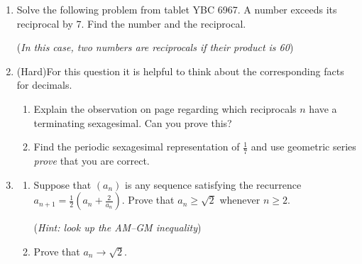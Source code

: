 \begin{exercises*}{}{}
\begin{enumerate}
  \item%
  Solve the following problem from tablet YBC 6967. A number exceeds its reciprocal by 7. Find the number and the reciprocal.\par
  (\emph{In this case, two numbers are reciprocals if their product is 60})

  \item (Hard)\lstsp For this question it is helpful to think about the corresponding facts for decimals.
  \begin{enumerate}
    \item Explain the observation on page \pageref{babfraction} regarding which reciprocals $n$ have a terminating sexagesimal. Can you prove this?
  	\item Find the periodic sexagesimal representation of $\frac 17$ and use geometric series \emph{prove} that you are correct.
  \end{enumerate}  
  
  \item\label{exs:methodmean}\begin{enumerate}
		\item Suppose that $(a_n)$ is any sequence satisfying the recurrence $a_{n+1}=\frac 12(a_n+\frac 2{a_n})$. Prove that $a_n\ge \sqrt 2$ whenever $n\ge 2$.\par
		(\emph{Hint: look up the AM--GM inequality})
		\item Prove that $a_n\to\sqrt 2$.
	\end{enumerate}
\end{enumerate}
\end{exercises*}

% 
